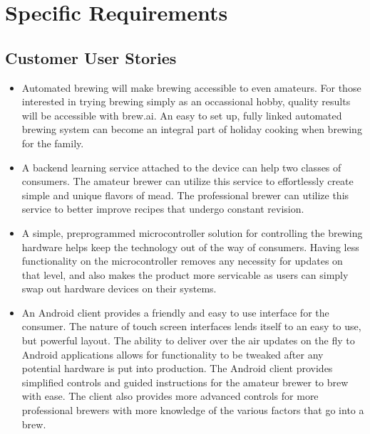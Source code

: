 \documentclass[draftclsnofoot,onecolumn,letterpaper,10pt]{IEEEtran}
\begin{document}
\section{Specific Requirements}
\subsection{Customer User Stories}
\begin{itemize}
	\item Automated brewing will make brewing accessible to even amateurs. For those interested in trying brewing simply as an
		occassional hobby, quality results will be accessible with brew.ai. An easy to set up, fully linked automated brewing system can
		become an integral part of holiday cooking when brewing for the family.
	\item A backend learning service attached to the device can help two classes of consumers. The amateur brewer can utilize this 
		service to effortlessly create simple and unique flavors of mead. The professional brewer can utilize this service
		to better improve recipes that undergo constant revision.
	\item A simple, preprogrammed microcontroller solution for controlling the brewing hardware helps keep the technology out of the way
		of consumers. Having less functionality on the microcontroller removes any necessity for updates on that level, and also makes
		the product more servicable as users can simply swap out hardware devices on their systems.
	\item An Android client provides a friendly and easy to use interface for the consumer. The nature of touch screen interfaces lends 
		itself to an easy to use, but powerful layout. The ability to deliver over the air updates on the fly to Android applications
		allows for functionality to be tweaked after any potential hardware is put into production. The Android client provides simplified
		controls and guided instructions for the amateur brewer to brew with ease. The client also provides more advanced controls for more
		professional brewers with more knowledge of the various factors that go into a brew.
\end{itemize}
\end{document}
